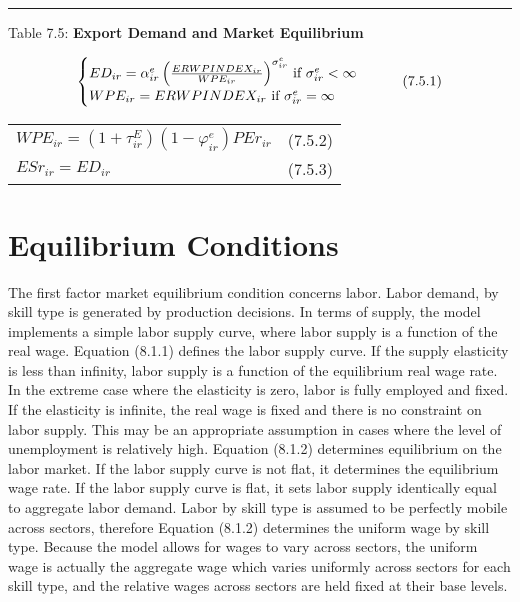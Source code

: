 \documentclass[12pt]{article}
\begin{document}
\noindent\rule{\linewidth}{0.4pt}
\begin{center}
\begin{large}
{\centering Table 7.5: \textbf{Export Demand and Market Equilibrium} \par}


\begin{equation}
    \begin{cases}
      $$ED_{ir} = \alpha^e_{ir} \left(\frac{ER WPINDEX_{ir}}{WPE_{ir}} \right)^{\sigma^e_{ir}}$$ \text{ if } $$\sigma^e_{ir} < \infty$$\\
      $$WPE_{ir} = ER WPINDEX_{ir}$$ \text{ if } $$\sigma^e_{ir} = \infty$$\\
    \end{cases}
    \tag{7.5.1}
\end{equation}

\begin{tabular}{>{\raggedright}p{} l}

$WPE_{ir} = \left(1 + \tau^E_{ir} \right) \left(1 - \varphi^e_{ir} \right) PEr_{ir}$ & (7.5.2)\\[15pt]

$ESr_{ir} = ED_{ir}$ & (7.5.3)\\[15pt]

\hline

\end{tabular}
\end{large}
\end{center}

\section{Equilibrium Conditions}

The first factor market equilibrium condition concerns labor. Labor demand, by skill type is generated by production decisions. In terms of supply, the model implements a simple labor supply curve, where labor supply is a function of the real wage. Equation (8.1.1) defines the labor supply curve. If the supply elasticity is less than infinity, labor supply is a function of the equilibrium real wage rate. In the extreme case where the elasticity is zero, labor is fully employed and fixed. If the elasticity is infinite, the real wage is fixed and there is no constraint on labor supply. This may be an appropriate assumption in cases where the level of unemployment is relatively high. Equation (8.1.2) determines equilibrium on the labor market. If the labor supply curve is not flat, it determines the equilibrium wage rate. If the labor supply curve is flat, it sets labor supply identically equal to aggregate labor demand. Labor by skill type is assumed to be perfectly mobile across sectors, therefore Equation (8.1.2) determines the uniform wage by skill type. Because the model allows for wages to vary across sectors, the uniform wage is actually the aggregate wage which varies uniformly across sectors for each skill type, and the relative wages across sectors are held fixed at their base levels.
\end{document}
